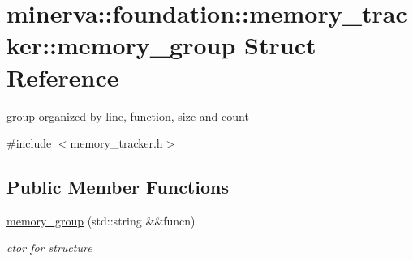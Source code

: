 \hypertarget{structminerva_1_1foundation_1_1memory__tracker_1_1memory__group}{}\section{minerva\+:\+:foundation\+:\+:memory\+\_\+tracker\+:\+:memory\+\_\+group Struct Reference}
\label{structminerva_1_1foundation_1_1memory__tracker_1_1memory__group}


group organized by line, function, size and count  




{\ttfamily \#include $<$memory\+\_\+tracker.\+h$>$}

\subsection*{Public Member Functions}
\begin{DoxyCompactItemize}
\item 
\mbox{\label{structminerva_1_1foundation_1_1memory__tracker_1_1memory__group_a0b996e4b95bf6f86bcc6572b73ea5732}} 
\hyperlink{structminerva_1_1foundation_1_1memory__tracker_1_1memory__group_a0b996e4b95bf6f86bcc6572b73ea5732}{memory\+\_\+group} (std\+::string \&\&funcn)
\begin{DoxyCompactList}\small\item\em ctor for structure \end{DoxyCompactList}\end{DoxyCompactItemize}
